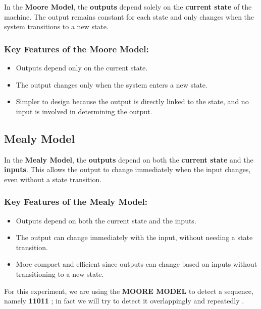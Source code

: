 \documentclass[a4paper,12pt]{article}
\begin{document}
In the \textbf{Moore Model}, the \textbf{outputs} depend solely on the \textbf{current state} of the machine. The output remains constant for each state and only changes when the system transitions to a new state.

\subsubsection{Key Features of the Moore Model:}
\begin{itemize}
    \item Outputs depend only on the current state.
    \item The output changes only when the system enters a new state.
    \item Simpler to design because the output is directly linked to the state, and no input is involved in determining the output.
\end{itemize}

\subsection*{Mealy Model}

In the \textbf{Mealy Model}, the \textbf{outputs} depend on both the \textbf{current state} and the \textbf{inputs}. This allows the output to change immediately when the input changes, even without a state transition.

\subsubsection*{Key Features of the Mealy Model:}
\begin{itemize}
    \item Outputs depend on both the current state and the inputs.
    \item The output can change immediately with the input, without needing a state transition.
    \item More compact and efficient since outputs can change based on inputs without transitioning to a new state.
\end{itemize}

For this experiment, we are using the \textbf{MOORE MODEL} to detect a sequence, namely \textbf{11011} ; in fact we will try to detect it overlappingly and repeatedly .
\end{document}
